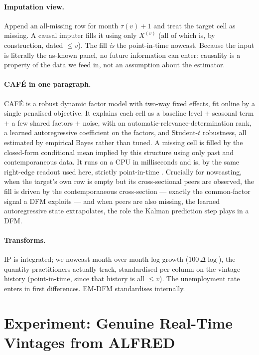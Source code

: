 \documentclass[11pt]{article}
\newcommand{\cafe}{CAF\'E}
\begin{document}
\paragraph{Imputation view.} Append an all-missing row for month $\tau(v)+1$ and treat the
target cell as missing. A causal imputer fills it using only $X^{(v)}$ (all of which is,
by construction, dated $\le v$). The fill \emph{is} the point-in-time nowcast. Because the
input is literally the as-known panel, no future information can enter: causality is a
property of the data we feed in, not an assumption about the estimator.

\paragraph{\cafe{} in one paragraph.} \cafe{} is a robust dynamic factor model with
two-way fixed effects, fit online by a single penalised objective. It explains each cell
as a baseline level $+$ seasonal term $+$ a few shared factors $+$ noise, with an
automatic-relevance-determination rank, a learned autoregressive coefficient on the
factors, and Student-$t$ robustness, all estimated by empirical Bayes rather than tuned.
A missing cell is filled by the closed-form conditional mean implied by this structure
using only past and contemporaneous data. It runs on a CPU in milliseconds and is, by the
same right-edge readout used here, strictly point-in-time \cite{cafe2025}. Crucially for
nowcasting, when the target's own row is empty but its cross-sectional peers are observed,
the fill is driven by the contemporaneous cross-section --- exactly the common-factor
signal a DFM exploits --- and when peers are also missing, the learned autoregressive
state extrapolates, the role the Kalman prediction step plays in a DFM.

\paragraph{Transforms.} IP is integrated; we nowcast month-over-month log growth
($100\,\Delta\log$), the quantity practitioners actually track, standardised per column on
the vintage history (point-in-time, since that history is all $\le v$). The unemployment
rate enters in first differences. EM-DFM standardises internally.

\section{Experiment: Genuine Real-Time Vintages from ALFRED}
\end{document}
